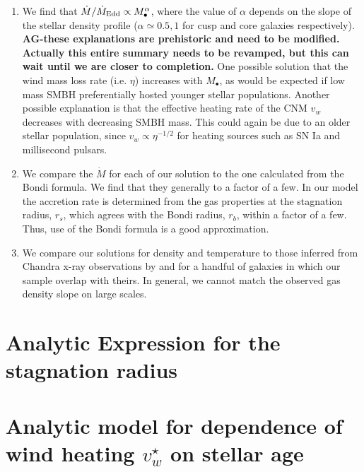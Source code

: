 \documentclass[usenatbib,fleqn]{mn2e}
\newcommand{\Mdot}{\dot{M}}
\newcommand{\eddr}{\dot{M}/\dot{M}_{\rm Edd}}
\newcommand{\rs}{r_s}
\newcommand{\rb}{r_b}
\newcommand{\Mbh}[1][]{M_{\bullet#1}}
\newcommand{\vwO}{v_{w}}
\begin{document}
  \begin{enumerate}
  \item We find that $\eddr \propto \Mbh^{\alpha}$, where the value of
    $\alpha$ depends on the slope of the stellar density profile
    ($\alpha\simeq0.5,1$ for cusp and core galaxies
    respectively). {\bf AG-these explanations are prehistoric and need
      to be modified. Actually this entire summary needs to be
      revamped, but this can wait until we are closer to completion.}
    One possible solution that the wind mass loss rate (i.e. $\eta$)
    increases with $\Mbh$, as would be expected if low mass SMBH
    preferentially hosted younger stellar populations. Another
    possible explanation is that the effective heating rate of the CNM
    $v_{w}$ decreases with decreasing SMBH mass. This could again be
    due to an older stellar population, since $v_{w} \propto
    \eta^{−1/2}$ for heating sources such as SN Ia and millisecond
    pulsars.
  \item We compare the $\Mdot$ for each of our solution to the one
    calculated from the Bondi formula. We find that they generally to
    a factor of a few. In our model the accretion rate is determined
    from the gas properties at the stagnation radius, $\rs$, which
    agrees with the Bondi radius, $\rb$, within a factor of a
    few. Thus, use of the Bondi formula is a good approximation.
  \item We compare our solutions for density and temperature to those
    inferred from Chandra x-ray observations by \citet{AllenDunn+:2006a}
    and \citet{RussellMcNamara+:2013a} for a handful of galaxies in
    which our sample overlap with theirs. In general, we cannot match
    the observed gas density slope on large scales. 
  \end{enumerate}
  


  \clearpage
  \appendix
  \section{Analytic Expression for the stagnation radius}
  \label{app:rs}
  


\section{Analytic model for dependence of wind heating $\vwO^{\star}$ on stellar age}
\label{app:windheat}


  \footnotesize{
    
    
  }
\end{document}
